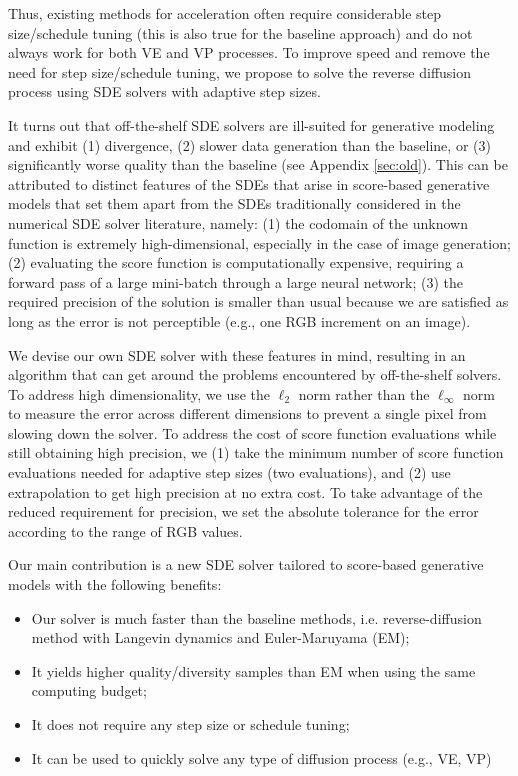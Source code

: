 \documentclass{article}
\begin{document}
Thus, existing methods for acceleration often require considerable step size/schedule tuning (this is also true for the baseline approach) and do not always work for both VE and VP processes. To improve speed and remove the need for step size/schedule tuning, we propose to solve the reverse diffusion process using SDE solvers with adaptive step sizes. 

It turns out that off-the-shelf SDE solvers are ill-suited for generative modeling and exhibit (1) divergence, (2) slower data generation than the baseline, or (3) significantly worse quality than the baseline (see Appendix \ref{sec:old}). This can be attributed to distinct features of the SDEs that arise in score-based generative models that set them apart from the SDEs traditionally considered in the numerical SDE solver literature, namely: (1) the codomain of the unknown function is extremely high-dimensional, especially in the case of image generation;
(2) evaluating the score function is computationally expensive, requiring a forward pass of a large mini-batch through a large neural network; (3) the required precision of the solution is smaller than usual because we are satisfied as long as the error is not perceptible (e.g., one RGB increment on an image).

We devise our own SDE solver with these features in mind, resulting in an algorithm that can get around the problems encountered by off-the-shelf solvers. To address high dimensionality, we use the $\ell_2$ norm rather than the $\ell_\infty$ norm to measure the error across different dimensions to prevent a single pixel from slowing down the solver. To address the cost of score function evaluations while still obtaining high precision, we (1) take the minimum number of score function evaluations needed for adaptive step sizes (two evaluations), and (2) use extrapolation to get high precision at no extra cost.
To take advantage of the reduced requirement for precision, we set the absolute tolerance for the error according to the range of RGB values. 



Our main contribution is a new SDE solver tailored to score-based generative models with the following benefits:
\begin{itemize}
 \item Our solver is much faster than the baseline methods, i.e. reverse-diffusion method with Langevin dynamics and Euler-Maruyama (EM);
 \item It yields higher quality/diversity samples than EM when using the same computing budget;
 \item It does not require any step size or schedule tuning;
 \item It can be used to quickly solve any type of diffusion process (e.g., VE, VP)
\end{itemize}
\end{document}
